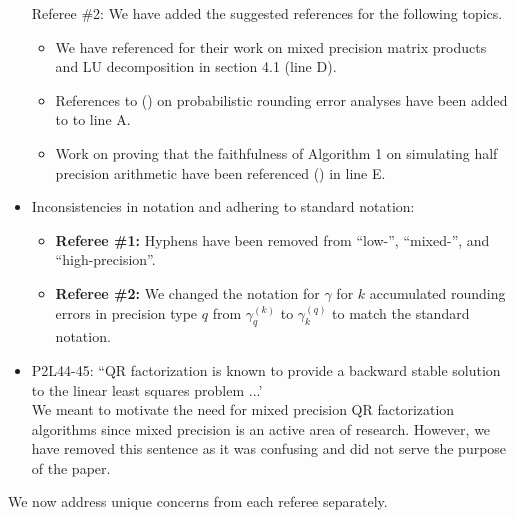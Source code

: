 \documentclass[10pt]{article}
\begin{document}
\begin{itemize}
    Referee \#2: {\normalfont We have added the suggested references for the following topics.}
    \begin{itemize}\normalfont
    	\item We have referenced \cite{Blanchard2019} for their work on mixed precision matrix products and LU decomposition in section 4.1 (line D).
    	\item References to (\cite{Higham2019a,Ipsen2019}) on probabilistic rounding error analyses have been added to to line A. 
    	\item Work on proving that the faithfulness of Algorithm 1 on simulating half precision arithmetic have been referenced (\cite{HighamPranesh2019b}) in line E. 
    \end{itemize}
	\item Inconsistencies in notation and adhering to standard notation:
	\begin{itemize}\normalfont
		\item \textbf{Referee \#1: }Hyphens have been removed from ``low-'', ``mixed-'', and ``high-precision''.
		\item \textbf{Referee \#2: }We changed the notation for $\gamma$ for $k$ accumulated rounding errors in precision type $q$ from $\gamma_{q}^{(k)}$ to $\gamma_{k}^{(q)}$ to match the standard notation.
	\end{itemize}
	\item P2L44-45: ``QR factorization is known to provide a backward stable solution to the linear least squares problem ...' \\
	{\normalfont
	We meant to motivate the need for mixed precision QR factorization algorithms since mixed precision is an active area of research.
	However, we have removed this sentence as it was confusing and did not serve the purpose of the paper.
	}
\end{itemize}

We now address unique concerns from each referee separately.
\end{document}
